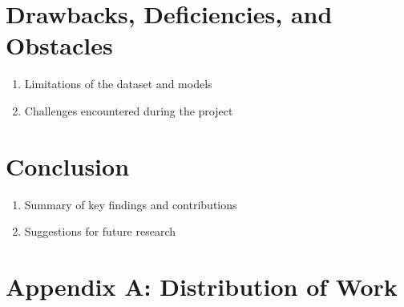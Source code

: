 \documentclass[letterpaper,11pt]{article}
\begin{document}

\section{Drawbacks, Deficiencies, and Obstacles}

\vspace{.1in}

\begin{enumerate}
    \item Limitations of the dataset and models
    \item Challenges encountered during the project
\end{enumerate}


\section{Conclusion}

\vspace{.1in}

\begin{enumerate}
    \item Summary of key findings and contributions
    \item Suggestions for future research
\end{enumerate}


\clearpage

\section*{Appendix A: Distribution of Work}


\end{document}
